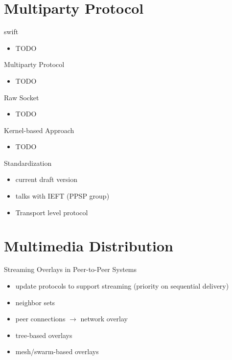 \documentclass{beamer}
\begin{document}
\section{Multiparty Protocol}

\begin{frame}{swift}
  \begin{itemize}
    \item TODO
  \end{itemize}
\end{frame}

\begin{frame}{Multiparty Protocol}
  \begin{itemize}
    \item TODO
  \end{itemize}
\end{frame}

\begin{frame}{Raw Socket}
  \begin{itemize}
    \item TODO
  \end{itemize}
\end{frame}

\begin{frame}{Kernel-based Approach}
  \begin{itemize}
    \item TODO
  \end{itemize}
\end{frame}

\begin{frame}{Standardization}
  \begin{itemize}
    \item current draft version
    \item talks with IEFT (PPSP group)
    \item Transport level protocol
  \end{itemize}
\end{frame}

\section{Multimedia Distribution}

\begin{frame}{Streaming Overlays in Peer-to-Peer Systems}
  \begin{itemize}
    \item update protocols to support streaming (priority on sequential
    delivery)
    \item neighbor sets
    \item peer connections $\rightarrow$ network overlay
    \item tree-based overlays
    \item mesh/swarm-based overlays
  \end{itemize}
\end{frame}
\end{document}
